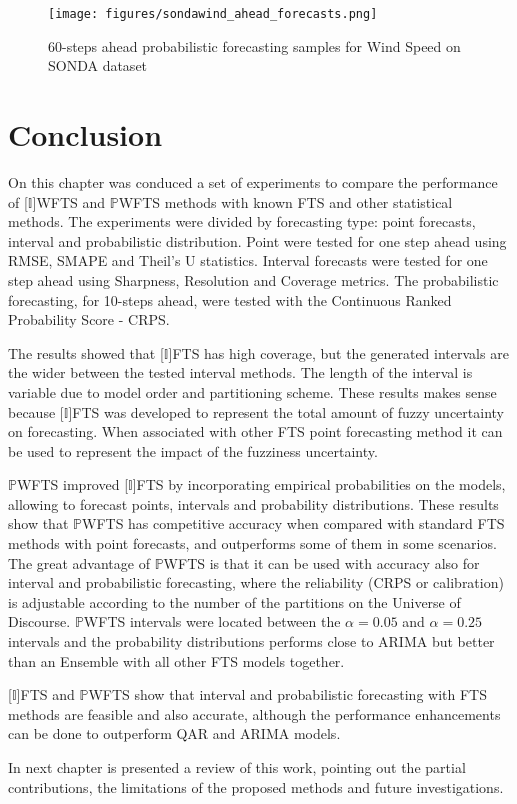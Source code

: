 \begin{figure}\ContinuedFloat
\texttt{[image: figures/sondawind\_ahead\_forecasts.png]}
\caption{60-steps ahead probabilistic forecasting samples for Wind Speed on SONDA dataset}
\label{fig:sondawind_ahead_forecasts}
\end{figure}


\section{Conclusion}

On this chapter was conduced a set of experiments to compare the performance of [$\mathbb{I}$]WFTS and $\mathbb{P}$WFTS methods with known FTS and other statistical methods. The experiments were divided by forecasting type: point forecasts, interval and probabilistic distribution. Point were tested for one step ahead using RMSE, SMAPE and Theil's U statistics. Interval forecasts were tested for one step ahead using Sharpness, Resolution and Coverage metrics. The probabilistic forecasting, for 10-steps ahead, were tested with the Continuous Ranked Probability Score - CRPS.

The results showed that [$\mathbb{I}$]FTS has high coverage, but the generated intervals are the wider between the tested interval methods. The length of the interval is variable due to model order and partitioning scheme. These results makes sense because [$\mathbb{I}$]FTS was developed to represent the total amount of fuzzy uncertainty on forecasting. When associated with other FTS point forecasting method it can be used to represent the impact of the fuzziness uncertainty.

$\mathbb{P}$WFTS improved [$\mathbb{I}$]FTS by incorporating empirical probabilities on the models, allowing to forecast points, intervals and probability distributions. These results show that $\mathbb{P}$WFTS has competitive accuracy when compared with standard FTS methods with point forecasts, and outperforms some of them in some scenarios. The great advantage of $\mathbb{P}$WFTS is that it can be used with accuracy also for interval and probabilistic forecasting, where the reliability (CRPS or calibration) is adjustable according to the number of the partitions on the Universe of Discourse. $\mathbb{P}$WFTS intervals were located between the $\alpha=0.05$ and $\alpha=0.25$ intervals and the probability distributions performs close to ARIMA but better than an Ensemble with all other FTS models together.

[$\mathbb{I}$]FTS and $\mathbb{P}$WFTS show that interval and probabilistic forecasting with FTS methods are feasible and also accurate, although the performance enhancements can be done to outperform QAR and ARIMA models. 

In next chapter is presented a review of this work, pointing out the partial contributions, the limitations of the proposed methods and future investigations.